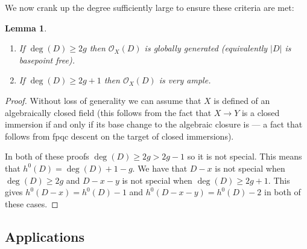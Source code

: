 \documentclass[12pt]{article}
\numberwithin{equation}{section}
\newtheorem{lemma}[theorem]{Lemma}
\theoremstyle{definition}
\theoremstyle{remark}
\newcommand{\Ocal}{\mathcal{O}}
\begin{document}
We now crank up the degree sufficiently large to ensure these criteria are met:
\begin{lemma}
	\begin{enumerate}
		\item If $\deg(D)\geq 2g$ then $\Ocal_X(D)$ is globally generated (equivalently $\vert D\vert$ is basepoint free).
		\item If $\deg(D)\geq 2g+1$ then $\Ocal_X(D)$ is very ample. 
	\end{enumerate}
\end{lemma}
\begin{proof}
	Without loss of generality we can assume that $X$ is defined of an algebraically closed field (this follows from the fact that $X\to Y$ is a closed immersion if and only if its base change to the algebraic closure is --- a fact that follows from fpqc descent on the target of closed immersions).
	
	In both of these proofs $\deg(D)\geq 2g>2g-1$ so it is not special. 
	This means that $h^0(D)=\deg(D)+1-g$.
	We have that $D-x$ is not special when $\deg(D)\geq 2g$ and $D-x-y$ is not special when $\deg(D)\geq 2g+1$.
	This gives $h^0(D-x) = h^0(D)-1$ and $h^0(D-x-y) = h^0(D)-2$ in both of these cases.
\end{proof}

\subsection{Applications}
\end{document}
